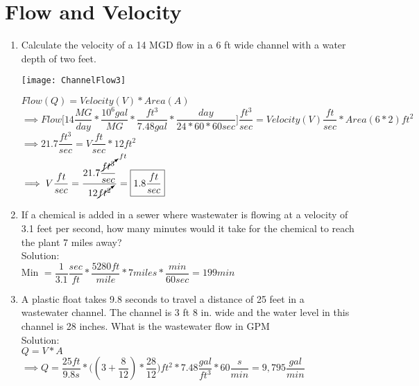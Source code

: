 \documentclass{article}
\begin{document}
\section{Flow and Velocity}
\begin{enumerate}
\item Calculate the velocity of a 14 MGD flow in a 6 ft wide channel with a water depth of two feet.\\
\begin{center}
\texttt{[image: ChannelFlow3]}
\end{center}
$Flow (Q) = Velocity (V) * Area (A)$\\
$\implies Flow\Big[ 14 \dfrac{MG}{day}* \dfrac{10^6 gal}{MG} * \dfrac{ft^3}{7.48 gal}*\dfrac{day}{24*60*60sec}\Big]\dfrac{ft^3}{sec} = Velocity(V) \dfrac{ft}{sec}* Area (6 * 2) ft ^2$\\
\vspace{0.2cm}
$\implies 21.7 \dfrac{ft^3}{sec}= V\dfrac{ft}{sec}*12ft^2$\\
$\implies V \dfrac{ft}{sec}= \dfrac{21.7\dfrac{\cancelto{ft}{ft^3}}{sec}}{12\cancelto{}{ft^2}}= \boxed{1.8\dfrac{ft}{sec}}$\\

\item If a chemical is added in a sewer where wastewater is flowing at a velocity of 3.1 feet per second, how many minutes would it take for the chemical to reach the plant 7 miles away?\\
Solution:\\
Min $= \dfrac{1}{3.1}\dfrac{sec}{ft}*\dfrac{5280ft}{mile}*7 miles*\dfrac{min}{60 sec} = \boxed{199 min}$
\\

\item A plastic float takes 9.8 seconds to travel a distance of 25 feet in a wastewater channel. The channel is 3 ft 8 in. wide and the water level in this channel is 28 inches. What is the wastewater flow in GPM\\
Solution:\\
\vspace{0.3cm}
$Q=V*A$\\
$\implies Q=\dfrac{25ft}{9.8s}*\Big((3+\dfrac{8}{12})*\dfrac{28}{12}\Big)ft^2*7.48\dfrac{gal}{ft^3}*60\dfrac{s}{min}=\boxed{9,795\dfrac{gal}{min}}$




\end{enumerate}
\end{document}
